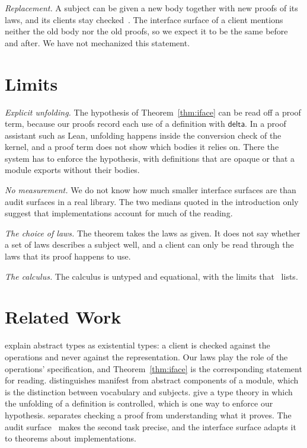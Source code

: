 \documentclass[acmsmall,nonacm,screen]{acmart}
\newcommand{\kw}[1]{\mathsf{#1}}
\begin{document}
\emph{Replacement.} A subject can be given a new body together with new proofs of its laws, and
its clients stay checked~\citep{tpp1}. The interface surface of a client mentions neither the
old body nor the old proofs, so we expect it to be the same before and after. We have not
mechanized this statement.

\section{Limits}

\emph{Explicit unfolding.} The hypothesis of Theorem~\ref{thm:iface} can be read off a proof
term, because our proofs record each use of a definition with $\kw{delta}$. In a proof assistant
such as Lean, unfolding happens inside the conversion check of the kernel, and a proof term does
not show which bodies it relies on. There the system has to enforce the hypothesis, with
definitions that are opaque or that a module exports without their bodies.

\emph{No measurement.} We do not know how much smaller interface surfaces are than audit surfaces
in a real library. The two medians quoted in the introduction only suggest that implementations
account for much of the reading.

\emph{The choice of laws.} The theorem takes the laws as given. It does not say whether a set of
laws describes a subject well, and a client can only be read through the laws that its proof
happens to use.

\emph{The calculus.} The calculus is untyped and equational, with the limits that~\citet{tpp1}
lists.

\section{Related Work}

\citet{mitchell1988} explain abstract types as existential types: a client is checked against
the operations and never against the representation. Our laws play the role of the operations'
specification, and Theorem~\ref{thm:iface} is the corresponding statement for reading.
\citet{leroy1994} distinguishes manifest from abstract components of a module, which is the
distinction between vocabulary and subjects. \citet{gratzer2022} give a type theory in which the
unfolding of a definition is controlled, which is one way to enforce our hypothesis.
\citet{pollack1998} separates checking a proof from understanding what it proves. The audit
surface~\citep{tpp1} makes the second task precise, and the interface surface adapts it to
theorems about implementations.
\end{document}
